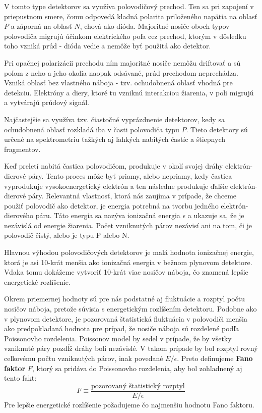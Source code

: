 \documentclass[../../main.tex]{subfiles}
\begin{document}
V tomto type detektorov sa využíva polovodičový prechod. Ten sa pri zapojení v priepustnom smere, čomu odpovedá kladná polarita priloženého napätia na oblasť $P$ a záporná na oblasť $N$, chová ako dióda. Majoritné nosiče oboch typov polovodiča migrujú účinkom elektrického poľa cez prechod, ktorým v dôsledku toho vzniká prúd - dióda vedie a nemôže byť použitá ako detektor.

Pri opačnej polarizácii prechodu ním majoritné nosiče nemôžu driftovať a sú poľom z neho a jeho okolia naopak odsávané, prúd prechodom neprechádza. Vzniká oblasť bez vlastného náboja - tzv. ochudobnená oblasť vhodná pre detekciu. Elektróny a diery, ktoré tu vzniknú interakciou žiarenia, v poli migrujú a vytvárajú prúdový signál.

Najčastejšie sa využíva tzv. čiastočné vyprázdnenie detektorov, kedy sa ochudobnená oblasť rozkladá iba v časti polovodiča typu $P$. Tieto detektory sú určené na spektrometriu ťažkých aj ľahkých nabitých častíc a štiepnych fragmentov.

Keď preletí nabitá častica polovodičom, produkuje v okolí svojej dráhy elektrón-dierové páry. Tento proces môže byť priamy, alebo nepriamy, kedy častica vyprodukuje vysokoenergetický elektrón a ten následne produkuje ďalšie elektrón-dierové páry. Relevantná vlastnosť, ktorá nás zaujíma v prípade, že chceme použiť polovodič ako detektor, je energia potrebná na tvorbu jedného elektrón-dierového páru. Táto energia sa nazýva ionizačná energia $\epsilon$ a ukazuje sa, že je nezávislá od energie žiarenia. Počet vzniknutých párov nezávisí ani na tom, či je polovodič čistý, alebo je typu P alebo N.

Hlavnou výhodou polovodičových detektorov je malá hodnota ionizačnej energie, ktorá je asi 10-krát menšia ako ionizačná energia v bežnom plynovom detektore. Vďaka tomu dokážeme vytvoriť 10-krát viac nosičov náboja, čo znamená lepšie energetické rozlíšenie. 

Okrem priemernej hodnoty sú pre nás podstatné aj fluktuácie a rozptyl počtu nosičov náboja, pretože súvisia s energetickým rozlíšením detektoru. Podobne ako v plynovom detektore, je pozorovaná štatistická fluktuácia v polovodiči menšia ako predpokladaná hodnota pre prípad, že nosiče náboja sú rozdelené podľa Poissonovho rozdelenia. Poissonov model by sedel v prípade, že by všetky vzniknuté páry pozdĺž dráhy boli nezávislé. V takom prípade by bol rozptyl rovný celkovému počtu vzniknutých párov, inak povedané $E/\epsilon$. Preto definujeme \textbf{Fano faktor} $F$, ktorý sa pridáva do Poissonovho rozdelenia, aby bol zohľadnený aj tento fakt:
\begin{equation}
F\equiv \dfrac{\text{pozorovaný štatistický rozptyl}}{E/\epsilon}
\end{equation}
Pre lepšie energetické rozlíšenie požadujeme čo najmenšiu hodnotu Fano faktoru.
\end{document}
